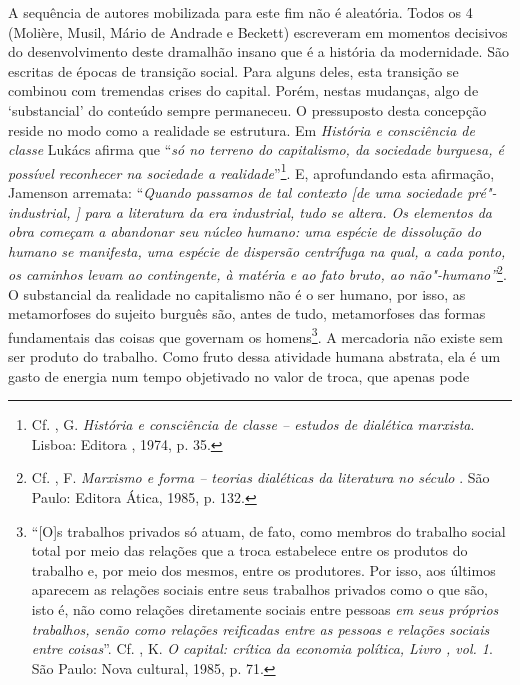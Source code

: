 A sequência de autores mobilizada para este fim não é aleatória. Todos
os 4 (Molière, Musil, Mário de Andrade e Beckett) escreveram em momentos
decisivos do desenvolvimento deste dramalhão insano que é a história da
modernidade. São escritas de épocas de transição social. Para alguns
deles, esta transição se combinou com tremendas crises do capital.
Porém, nestas mudanças, algo de `substancial' do conteúdo sempre
permaneceu. O pressuposto desta concepção reside no modo como a
realidade se estrutura. Em \emph{História e consciência de classe}
Lukács afirma que ``\emph{só no terreno do capitalismo, da sociedade
burguesa, é possível reconhecer na sociedade a realidade}''\footnote{Cf.
  , G. \emph{História e consciência de classe -- estudos
  de dialética marxista}. Lisboa: Editora , 1974, p. 35.}. E,
aprofundando esta afirmação, Jamenson arremata: ``\emph{Quando passamos
de tal contexto [de uma sociedade pré"-industrial, ] para a
literatura da era industrial, tudo se altera. Os elementos da obra
começam a abandonar seu núcleo humano: uma espécie de dissolução do
humano se manifesta, uma espécie de dispersão centrífuga na qual, a cada
ponto, os caminhos levam ao contingente, à matéria e ao fato bruto, ao
não"-humano''}\footnote{Cf. , F. \emph{Marxismo e forma --
  teorias dialéticas da literatura no século }. São Paulo: Editora
  Ática, 1985, p. 132.}. O substancial da realidade no capitalismo não é
o ser humano, por isso, as metamorfoses do sujeito burguês são, antes de
tudo, metamorfoses das formas fundamentais das coisas que governam os
homens\footnote{``[O]s trabalhos privados só atuam, de fato, como
  membros do trabalho social total por meio das relações que a troca
  estabelece entre os produtos do trabalho e, por meio dos mesmos, entre
  os produtores. Por isso, aos últimos aparecem as relações sociais
  entre seus trabalhos privados como o que são, isto é, não como
  relações diretamente sociais entre pessoas \emph{em seus próprios
  trabalhos, senão como relações reificadas entre as pessoas e relações
  sociais entre coisas}''. Cf. , K. \emph{O capital: crítica da
  economia política, Livro , vol. 1}. São Paulo: Nova
  cultural, 1985, p. 71.}. A mercadoria não existe sem ser produto do
trabalho. Como fruto dessa atividade humana abstrata, ela é um gasto de
energia num tempo objetivado no valor de troca, que apenas pode
